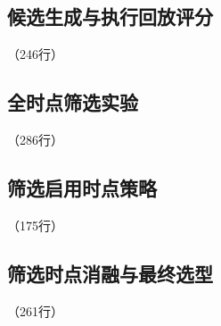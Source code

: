 \label{code:source:07:end}


\subsection{候选生成与执行回放评分}

\label{code:source:08}

{\small\noindent{}\quad（246行）\par}


\label{code:source:08:end}


\subsection{全时点筛选实验}

\label{code:source:09}

{\small\noindent{}\quad（286行）\par}


\label{code:source:09:end}


\subsection{筛选启用时点策略}

\label{code:source:10}

{\small\noindent{}\quad（175行）\par}


\label{code:source:10:end}


\subsection{筛选时点消融与最终选型}

\label{code:source:11}

{\small\noindent{}\quad（261行）\par}

